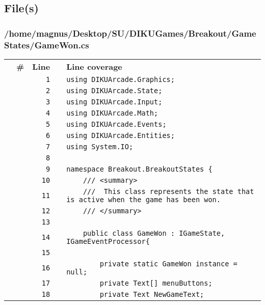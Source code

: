 \documentclass[a4paper,landscape,10pt]{article}
\begin{document}
\subsection{File(s)}
\subsubsection{/home/magnus/Desktop/SU/DIKUGames/Breakout/GameStates/GameWon.cs}
\begin{longtable}[l]{lrrll}
\textbf{} & \textbf{\#} & \textbf{Line} & \textbf{} & \textbf{Line coverage}\\
\cellcolor{gray} &  & \verb~1~ & & \verb~using DIKUArcade.Graphics;~\\
\cellcolor{gray} &  & \verb~2~ & & \verb~using DIKUArcade.State;~\\
\cellcolor{gray} &  & \verb~3~ & & \verb~using DIKUArcade.Input;~\\
\cellcolor{gray} &  & \verb~4~ & & \verb~using DIKUArcade.Math;~\\
\cellcolor{gray} &  & \verb~5~ & & \verb~using DIKUArcade.Events;~\\
\cellcolor{gray} &  & \verb~6~ & & \verb~using DIKUArcade.Entities;~\\
\cellcolor{gray} &  & \verb~7~ & & \verb~using System.IO;~\\
\cellcolor{gray} &  & \verb~8~ & & \verb~~\\
\cellcolor{gray} &  & \verb~9~ & & \verb~namespace Breakout.BreakoutStates {~\\
\cellcolor{gray} &  & \verb~10~ & & \verb~    /// <summary>~\\
\cellcolor{gray} &  & \verb~11~ & & \verb~    ///  This class represents the state that is active when the game has been won.~\\
\cellcolor{gray} &  & \verb~12~ & & \verb~    /// </summary>~\\
\cellcolor{gray} &  & \verb~13~ & & \verb~~\\
\cellcolor{gray} &  & \verb~14~ & & \verb~    public class GameWon : IGameState, IGameEventProcessor{~\\
\cellcolor{gray} &  & \verb~15~ & & \verb~~\\
\cellcolor{gray} &  & \verb~16~ & & \verb~        private static GameWon instance = null;~\\
\cellcolor{gray} &  & \verb~17~ & & \verb~        private Text[] menuButtons;~\\
\cellcolor{gray} &  & \verb~18~ & & \verb~        private Text NewGameText;~\\

\end{longtable}
\end{document}
